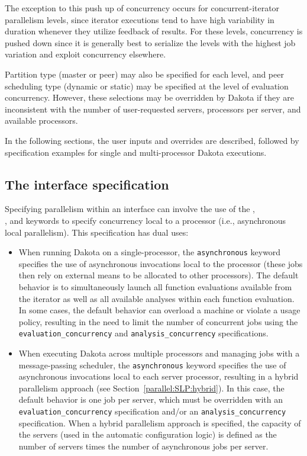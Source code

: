 The exception to this push up of concurrency occurs for
concurrent-iterator parallelism levels, since iterator executions tend
to have high variability in duration whenever they utilize feedback of
results.  For these levels, concurrency is pushed down since it is
generally best to serialize the levels with the highest job variation
and exploit concurrency elsewhere.

Partition type (master or peer) may also be specified for each level, 
and peer scheduling type (dynamic or static) may be specified at the 
level of evaluation concurrency. However, these selections may be 
overridden by Dakota if they are inconsistent with the number of 
user-requested servers, processors per server, and available processors.

In the following sections, the user inputs and overrides are
described, followed by specification examples for single and
multi-processor Dakota executions.

\subsection{The interface specification}\label{parallel:spec:interface}

Specifying parallelism within an interface can involve the use of the
,\\ , and
 keywords to specify concurrency local
to a processor (i.e., asynchronous local parallelism). This
 specification has dual uses:

\begin{itemize}
\item When running Dakota on a single-processor, the
  \texttt{asynchronous} keyword specifies the use of asynchronous
  invocations local to the processor (these jobs then rely on external
  means to be allocated to other processors). The default behavior is
  to simultaneously launch all function evaluations available from the
  iterator as well as all available analyses within each function
  evaluation. In some cases, the default behavior can overload a
  machine or violate a usage policy, resulting in the need to limit
  the number of concurrent jobs using the
  \texttt{evaluation\_concurrency} and \texttt{analysis\_concurrency}
  specifications. 

\item When executing Dakota across multiple processors and managing
  jobs with a message-passing scheduler, the \texttt{asynchronous}
  keyword specifies the use of asynchronous invocations local to each
  server processor, resulting in a hybrid parallelism approach (see
  Section~\ref{parallel:SLP:hybrid}). In this case, the default
  behavior is one job per server, which must be overridden with an
  \texttt{evaluation\_concurrency} specification and/or an
  \texttt{analysis\_concurrency} specification. When a hybrid
  parallelism approach is specified, the capacity of the servers (used
  in the automatic configuration logic) is defined as the number of
  servers times the number of asynchronous jobs per server.
\end{itemize}

